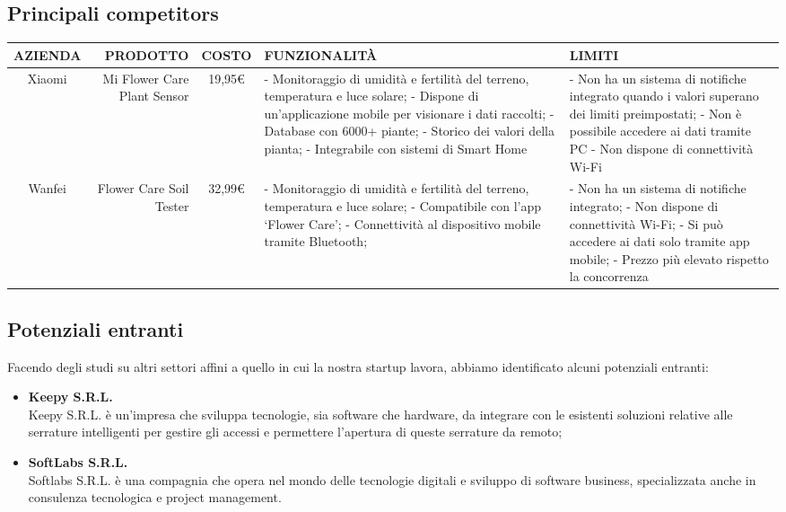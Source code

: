 \subsection{Principali competitors}
\begin{center}
\begin{tabularx}{\textwidth}{| S | D | S | L | L |}
  \hline
  \textbf{AZIENDA} &
  \textbf{PRODOTTO} &
  \textbf{COSTO} &
  \textbf{FUNZIONALIT\`A} &
  \textbf{LIMITI} \\	
  \hline
 Xiaomi & Mi Flower Care Plant Sensor & 19,95€ &
- Monitoraggio di umidità e fertilità del terreno, temperatura e luce solare;\newline
- Dispone di un’applicazione mobile per visionare i dati raccolti;\newline
- Database con 6000+ piante;\newline
- Storico dei valori della pianta;\newline
- Integrabile con sistemi di Smart Home & 
- Non ha un sistema di notifiche integrato quando i valori superano dei limiti preimpostati;\newline
- Non è possibile accedere ai dati tramite PC\newline
- Non dispone di connettività Wi-Fi \\	\hline
 Wanfei & Flower Care Soil Tester & 32,99€ &
- Monitoraggio di umidità e fertilità del terreno, temperatura e luce solare;\newline
- Compatibile con l’app ‘Flower Care’;\newline
- Connettività al dispositivo mobile tramite Bluetooth; &
- Non ha un sistema di notifiche integrato;\newline
- Non dispone di connettività Wi-Fi;\newline
- Si può accedere ai dati solo tramite app mobile;\newline
- Prezzo più elevato rispetto la concorrenza \\	\hline
\end{tabularx}
\end{center}

\subsection{Potenziali entranti}

Facendo degli studi su altri settori affini a quello in cui la nostra startup lavora, abbiamo identificato alcuni potenziali entranti:
\begin{itemize}
	\item \textbf{Keepy S.R.L.}\\
	Keepy S.R.L. è un’impresa che sviluppa tecnologie, sia software che hardware, da integrare con le esistenti soluzioni relative alle serrature intelligenti per gestire gli accessi e permettere l’apertura di queste serrature da remoto;
	\item \textbf{SoftLabs S.R.L.}\\
	Softlabs S.R.L. è una compagnia che opera nel mondo delle tecnologie digitali e sviluppo di software business, specializzata anche in consulenza tecnologica e project management. 
\end{itemize}

